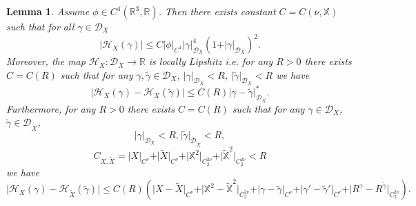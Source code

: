 \documentclass[11pt,a4paper,leqno]{amsart}%
\theoremstyle{plain}
\theoremstyle{remark}
\theoremstyle{plain}
\newtheorem{lemma}[theorem]{Lemma}
\numberwithin{equation}{section}
\def\Rnu{{\mathbb R}}
\begin{document}
\begin{lemma}\label{lem:EnergyProperties}
Assume $\phi\in C^4(\Rnu^3,\Rnu)$. Then there exists constant
$C=C(\nu,\mathbb{X})$ such that for all $\gamma\in \mathcal{D}_X$
\begin{equation}
\vert \mathcal{H}_X(\gamma)\vert \leq
C\vert \phi\vert_{C^4}\vert \gamma\vert_{\mathcal{D}_X}^4(1+\vert \gamma\vert_{\mathcal{D}_X})^2.\label{eqn:EnergyEstimAbove}
\end{equation}
Moreover, the map $\mathcal{H}_X:\mathcal{D}_X\to\Rnu$ is locally
Lipshitz i.e. for any $R>0$ there exists $C=C(R)$ such that for
any $\gamma,\tilde{\gamma}\in\mathcal{D}_X$,
$\vert \gamma\vert_{\mathcal{D}_X}<R$, $\vert \tilde{\gamma}\vert_{\mathcal{D}_X}<R$
we have
\begin{equation}
\vert \mathcal{H}_X(\gamma)-\mathcal{H}_X(\tilde{\gamma})\vert \leq
C(R)\vert \gamma-\tilde{\gamma}\vert_{\mathcal{D}_X}^*.\label{eqn:LocLipshitz}
\end{equation}
Furthermore, for any $R>0$ there exists $C=C(R)$ such that for any
$\gamma\in\mathcal{D}_X$,
$\tilde{\gamma}\in\mathcal{D}_{\tilde{X}}$,
$$
\vert \gamma\vert_{\mathcal{D}_X}<R,
\vert \tilde{\gamma}\vert_{\mathcal{D}_{\tilde{X}}}<R,
$$
$$
C_{X,\tilde{X}}=\vert X\vert_{C^{\nu}}+\vert \tilde{X}\vert_{C^{\nu}}+\vert \mathbb{X}^2\vert_{C_2^{2\nu}}+\vert \mathbb{\tilde{X}}^2\vert_{C_2^{2\nu}}<R
$$
we have
\begin{equation}
\vert \mathcal{H}_X(\gamma)-\mathcal{H}_{\tilde{X}}(\tilde{\gamma})\vert \leq
C(R)(\vert X-\tilde{X}\vert_{C^{\nu}}+\vert \mathbb{X}^2-\mathbb{\tilde{X}}^2\vert_{C_2^{2\nu}}+\vert \gamma-\tilde{\gamma}\vert_{C^{\nu}}+\vert \gamma'-\tilde{\gamma}'\vert_{C^{\nu}}+\vert R^{\gamma}-R^{\tilde{\gamma}}\vert_{C_2^{2\nu}}).\label{eqn:LocLipshitz-2}
\end{equation}
\end{lemma}
\end{document}
